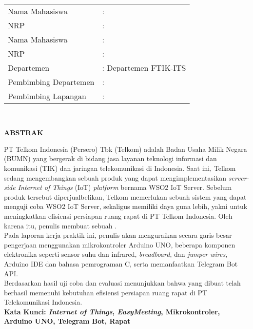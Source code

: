 \thispagestyle{plain}
\begin{centering}
	\textbf{\MakeUppercase{\judul}}
\end{centering} \\[20pt]
\begin{tabular}{ll}
	Nama Mahasiswa  &: \MakeUppercase{\namaPenulisSatu} \\
	NRP &: \nrpPenulisSatu \\
	Nama Mahasiswa  & : \MakeUppercase{\namaPenulisDua} \\
	NRP &: \nrpPenulisDua \\
	Departemen  &: Departemen \departemen FTIK-ITS \\
	Pembimbing Departemen  &: \pembimbingDept \\
	Pembimbing Lapangan  &: \pembimbingLap
\end{tabular} \\[10pt]
\begin{center}
	\textbf{ABSTRAK}
\end{center}
\indent\indent PT Telkom Indonesia (Persero) Tbk (Telkom) adalah Badan Usaha Milik Negara (BUMN) yang bergerak di bidang jasa layanan teknologi informasi dan komunikasi (TIK) dan jaringan telekomunikasi di Indonesia. Saat ini, Telkom sedang mengembangkan sebuah produk yang dapat mengimplementasikan \textit{server-side Internet of Things} (IoT) \textit{platform} bernama WSO2 IoT Server. Sebelum produk tersebut diperjualbelikan, Telkom memerlukan sebuah sistem yang dapat menguji coba WSO2 IoT Server, sekaligus memiliki daya guna lebih, yakni untuk meningkatkan efisiensi persiapan ruang rapat di PT Telkom Indonesia. Oleh karena itu, penulis membuat sebuah \namaSistem. \\
\indent Pada laporan kerja praktik ini, penulis akan menguraikan secara garis besar pengerjaan \namaSistem menggunakan mikrokontroler Arduino UNO, beberapa komponen elektronika seperti sensor suhu dan infrared, \textit{breadboard}, dan \textit{jumper wires}, Arduino IDE dan bahasa pemrograman C, serta memanfaatkan Telegram Bot API.\\
\indent Berdasarkan hasil uji coba dan evaluasi menunjukkan bahwa \namaSistem yang dibuat telah berhasil memenuhi kebutuhan efisiensi persiapan ruang rapat di PT Telekomunikasi Indonesia. \\[10pt]
\textbf{Kata Kunci: \textit{Internet of Things}, \textit{EasyMeeting}, Mikrokontroler, Arduino UNO, Telegram Bot, Rapat}


\cleardoublepage
